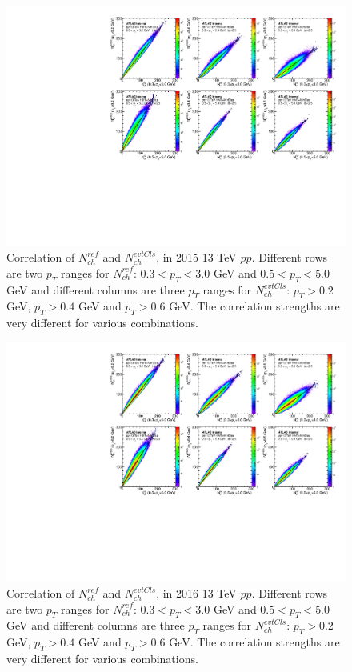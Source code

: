 \begin{figure}[H]
\centering
\includegraphics[width=1.\linewidth]{figs/sec_ana/mon_pp13_2015_trkCrr.pdf}
\caption{Correlation of $N_{ch}^{ref}$ and $N_{ch}^{evtCls}$, in 2015 13 TeV $pp$. Different rows are two $p_{T}$ ranges for $N_{ch}^{ref}$: $0.3<p_{T}<3.0$ GeV and $0.5<p_{T}<5.0$ GeV and different columns are three $p_{T}$ ranges for $N_{ch}^{evtCls}$: $p_{T}>0.2$ GeV, $p_{T}>0.4$ GeV and $p_{T}>0.6$ GeV. The correlation strengths are very different for various combinations.}
\label{fig:mon_pp13_2015_trkCrr}
\end{figure}
\begin{figure}[H]
\centering
\includegraphics[width=1.\linewidth]{figs/sec_ana/mon_pp13_2016_trkCrr.pdf}
\caption{Correlation of $N_{ch}^{ref}$ and $N_{ch}^{evtCls}$, in 2016 13 TeV $pp$. Different rows are two $p_{T}$ ranges for $N_{ch}^{ref}$: $0.3<p_{T}<3.0$ GeV and $0.5<p_{T}<5.0$ GeV and different columns are three $p_{T}$ ranges for $N_{ch}^{evtCls}$: $p_{T}>0.2$ GeV, $p_{T}>0.4$ GeV and $p_{T}>0.6$ GeV. The correlation strengths are very different for various combinations.}
\label{fig:mon_pp13_2016_trkCrr}
\end{figure}
